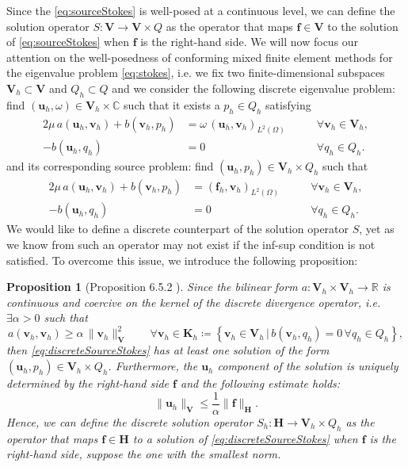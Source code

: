 \documentclass[USenglish]{article}
\theoremstyle{dgthm}
\newtheorem{proposition}{Proposition}
\theoremstyle{dgdef}
\let\vec\bm
\newcommand\norm[1]{\lVert#1\rVert}
\begin{document}
Since the \eqref{eq:sourceStokes} is well-posed at a continuous level, we can define the solution operator $S:\vec{V}\to \vec{V}\times Q$ as the operator that maps $\vec{f}\in \vec{V}$ to the solution of \eqref{eq:sourceStokes} when $\vec{f}$ is the right-hand side.
We will now focus our attention on the well-posedness of conforming mixed finite element methods for the eigenvalue problem \eqref{eq:stokes}, i.e. we fix two finite-dimensional subspaces $\vec{V}_h\subset \vec{V}$ and $Q_h\subset Q$ and we consider the following discrete eigenvalue problem:
find $(\vec{u}_h,\omega)\in \vec{V}_h\times \mathbb{C}$ such that it exists a $p_h\in Q_h$ satisfying
\begin{equation}
  \label{eq:discreteStokes}
  \begin{aligned}
    2\mu\, a(\vec{u}_h,\vec{v}_h) + b(\vec{v}_h,p_h)&=\omega\, (\vec{u}_h,\vec{v}_h)_{L^2(\Omega)} \qquad &\forall \vec{v}_h\in \vec{V}_h,\\
    -b(\vec{u}_h,q_h)&=0 \qquad &\forall q_h\in Q_h.
  \end{aligned}
\end{equation}
and its corresponding source problem:
find $(\vec{u}_h,p_h)\in \vec{V}_h\times Q_h$ such that
\begin{equation}
  \label{eq:discreteSourceStokes}
  \begin{aligned}
    2\mu\, a(\vec{u}_h,\vec{v}_h) + b(\vec{v}_h,p_h)&=(\vec{f}_h,\vec{v}_h)_{L^2(\Omega)} \qquad &\forall \vec{v}_h\in \vec{V}_h,\\
    -b(\vec{u}_h,q_h)&=0 \qquad &\forall q_h\in Q_h.
  \end{aligned}
\end{equation}
We would like to define a discrete counterpart of the solution operator $S$, yet as we know from \cite{Brezzi} such an operator may not exist if the inf-sup condition is not satisfied.
To overcome this issue, we introduce the following proposition:
\begin{proposition}[Proposition 6.5.2 \cite{BBF}]
  \label{prop:BBG}
  Since the bilinear form $a:\vec{V}_h\times \vec{V}_h\to \mathbb{R}$ is continuous and coercive on the kernel of the discrete divergence operator, i.e.~$\exists \alpha>0$ such that
  \begin{equation}
    a(\vec{v}_h,\vec{v}_h)\geq \alpha\, \norm{\vec{v}_h}^2_{\vec{V}} \qquad \forall \vec{v}_h\in \vec{K}_h\coloneqq \left\{\vec{v}_h\in \vec{V}_h\,|\, b(\vec{v}_h,q_h)=0\, \forall q_h\in Q_h\right\},
  \end{equation}
  then \eqref{eq:discreteSourceStokes} has at least one solution of the form $(\vec{u}_h,p_h)\in \vec{V}_h\times Q_h$. Furthermore, the $\vec{u}_h$ component of the solution is uniquely determined by the right-hand side $\vec{f}$ and the following estimate holds:
  \begin{equation}
    \norm{\vec{u}_h}_{\vec{V}}\leq \frac{1}{\alpha}\norm{\vec{f}}_{\vec{H}}.
  \end{equation}
  Hence, we can define the discrete solution operator $S_h:\vec{H}\to \vec{V}_h\times Q_h$ as the operator that maps $\vec{f}\in \vec{H}$ to a solution of \eqref{eq:discreteSourceStokes} when $\vec{f}$ is the right-hand side, suppose the one with the smallest norm.
\end{proposition}
\end{document}
